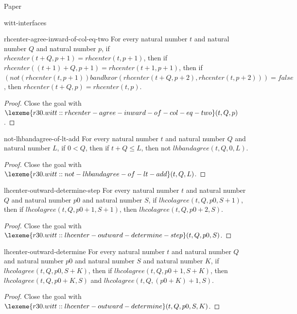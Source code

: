 \begin{lexlean}{Paper}
\begin{section}{witt-interfaces}
  \begin{theorem}{rhcenter-agree-inward-of-col-eq-two}
  For every natural number \(t\) and natural number \(Q\) and natural number \(p\), if \(rhcenter(t + Q, p + 1) = rhcenter(t, p + 1)\), then if \(rhcenter((t + 1) + Q, p + 1) = rhcenter(t + 1, p + 1)\), then if \((not(rhcenter(t, p + 1)) band bxor(rhcenter(t + Q, p + 2), rhcenter(t, p + 2))) = false\), then \(rhcenter(t + Q, p) = rhcenter(t, p)\).
  \begin{proof}
  Close the goal with \(\lexeme{r30.witt::rhcenter-agree-inward-of-col-eq-two}(t, Q, p)\).
  \end{proof}
  \end{theorem}

  \begin{theorem}{not-lhbandagree-of-lt-add}
  For every natural number \(t\) and natural number \(Q\) and natural number \(L\), if \(0 < Q\), then if \(t + Q ≤ L\), then not \(lhbandagree(t, Q, 0, L)\).
  \begin{proof}
  Close the goal with \(\lexeme{r30.witt::not-lhbandagree-of-lt-add}(t, Q, L)\).
  \end{proof}
  \end{theorem}

  \begin{theorem}{lhcenter-outward-determine-step}
  For every natural number \(t\) and natural number \(Q\) and natural number \(p0\) and natural number \(S\), if \(lhcolagree(t, Q, p0, S + 1)\), then if \(lhcolagree(t, Q, p0 + 1, S + 1)\), then \(lhcolagree(t, Q, p0 + 2, S)\).
  \begin{proof}
  Close the goal with \(\lexeme{r30.witt::lhcenter-outward-determine-step}(t, Q, p0, S)\).
  \end{proof}
  \end{theorem}

  \begin{theorem}{lhcenter-outward-determine}
  For every natural number \(t\) and natural number \(Q\) and natural number \(p0\) and natural number \(S\) and natural number \(K\), if \(lhcolagree(t, Q, p0, S + K)\), then if \(lhcolagree(t, Q, p0 + 1, S + K)\), then \(lhcolagree(t, Q, p0 + K, S)\) and \(lhcolagree(t, Q, (p0 + K) + 1, S)\).
  \begin{proof}
  Close the goal with \(\lexeme{r30.witt::lhcenter-outward-determine}(t, Q, p0, S, K)\).
  \end{proof}
  \end{theorem}


\end{section}
\end{lexlean}
